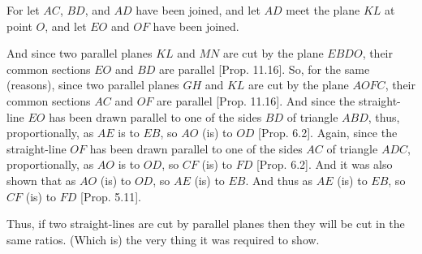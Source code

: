 \begin{Parallel}{}{}
{For let $AC$, $BD$, and $AD$ have been joined, and let $AD$ meet the
plane $KL$ at point $O$, and let $EO$ and $OF$ have been joined.

And since two parallel planes $KL$ and $MN$ are cut by the
plane $EBDO$, their common sections $EO$ and $BD$ are parallel
[Prop. 11.16]. So, for the same (reasons), 
since two parallel planes $GH$ and $KL$ are cut by the plane
$AOFC$, their common sections $AC$ and $OF$ are 
parallel [Prop. 11.16]. And since the straight-line $EO$ has been drawn parallel to
one of the sides $BD$ of triangle $ABD$, thus, proportionally, as 
$AE$ is to $EB$, so $AO$ (is) to $OD$ [Prop. 6.2]. 
Again, since the straight-line $OF$ has been drawn parallel to one of the sides $AC$
of triangle $ADC$, proportionally, as $AO$ is to $OD$, so $CF$ (is) to $FD$ [Prop. 6.2]. And it was also shown that as $AO$ (is) to $OD$, so $AE$ (is) to $EB$.
And thus as $AE$ (is) to $EB$, so $CF$ (is) to $FD$ [Prop. 5.11].

\epsfysize=3in
\centerline{}

Thus, if two straight-lines are cut by parallel planes then
they will be cut in the same ratios. (Which is) the very thing it was required to
show.}
\end{Parallel}

